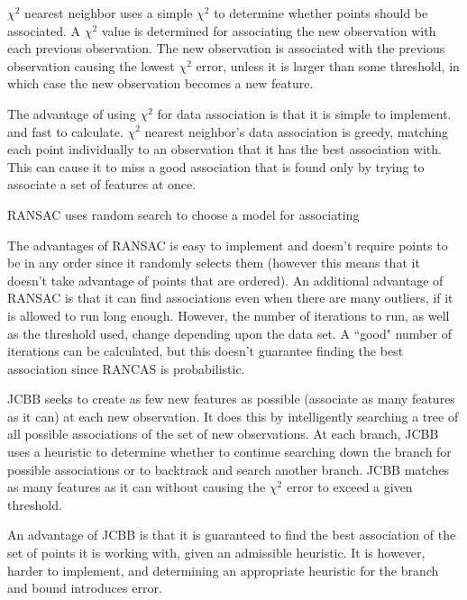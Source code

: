 \documentclass[12pt]{article}
\begin{document}
	$\chi^2$ nearest neighbor uses a simple $\chi^2$ to determine whether points
should be associated.  A $\chi^2$ value is determined for associating the new observation
with each previous observation.  The new observation is associated with the previous
observation causing the lowest $\chi^2$ error, unless it is larger than some threshold,
in which case the new observation becomes a new feature.

	The advantage of using $\chi^2$ for data association is that it is simple to implement.
and fast to calculate.  $\chi^2$ nearest neighbor's data association is greedy, matching
each point individually to an observation that it has the best association with.  This can
cause it to miss a good association that is found only by trying to associate a set of features
 at once.

	RANSAC uses random search to choose a model for associating

	The advantages of RANSAC is easy to implement and doesn't require points to
be in any order since it randomly selects them (however this means that it doesn't take
advantage of points that are ordered).  An additional advantage of RANSAC is that it
can find associations even when there are many outliers, if it is allowed to run long enough.
However, the number of iterations to run, as well as the threshold used, change depending
upon the data set.  A ``good" number of iterations can be calculated, but this doesn't
guarantee finding the best association since RANCAS is probabilistic.

	JCBB seeks to create as few new features as possible (associate as many features
as it can) at each new observation.  It does this by intelligently searching a tree of all
possible associations of the set of new observations.  At each branch, JCBB uses a
heuristic to determine whether to continue searching down the branch for possible
associations or to backtrack and search another branch.  JCBB matches as many features
as it can without causing the $\chi^2$ error to exceed a given threshold.

	An advantage of JCBB is that it is guaranteed to find the best association of the
set of points it is working with, given an admissible heuristic.  It is however, harder to
implement, and determining an appropriate heuristic for the branch and bound introduces
error.
\end{document}
